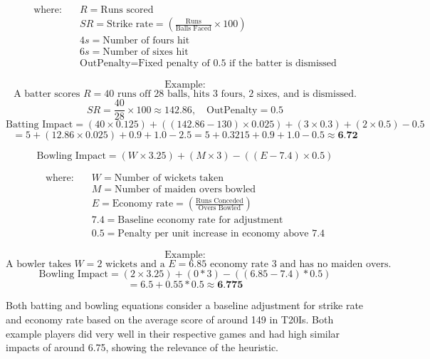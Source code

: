\documentclass{article}[12pt]
\begin{document}
\[
\begin{aligned}
\text{where:} \quad 
& R = \text{Runs scored} \\
& SR = \text{Strike rate} = \left( \frac{\text{Runs}}{\text{Balls Faced}} \times 100 \right) \\
& 4s = \text{Number of fours hit} \\
& 6s = \text{Number of sixes hit} \\
& \text{OutPenalty} = \text{Fixed penalty of 0.5 if the batter is dismissed}
\end{aligned}
\]

\[
\text{Example:}
\]
\[
\text{A batter scores } R = 40 \text{ runs off } 28 \text{ balls, hits } 3 \text{ fours, 2 sixes, and is dismissed.}
\]
\[
SR = \frac{40}{28} \times 100 \approx 142.86, \quad \text{OutPenalty} = 0.5
\]
\[
\text{Batting Impact} = (40 \times 0.125) + ((142.86 - 130) \times 0.025) + (3 \times 0.3) + (2 \times 0.5) - 0.5
\]
\[
= 5 + (12.86 \times 0.025) + 0.9 + 1.0 - 2.5 = 5 + 0.3215 + 0.9 + 1.0 - 0.5 \approx \textbf{6.72}
\]

\begin{equation}
    \text{Bowling Impact} = (W \times 3.25) + (M \times 3) - ((E - 7.4) \times 0.5)
    \label{eq2}
\end{equation}

\[
\begin{aligned}
\text{where:} \quad 
& W = \text{Number of wickets taken} \\
& M = \text{Number of maiden overs bowled} \\
& E = \text{Economy rate} = \left( \frac{\text{Runs Conceded}}{\text{Overs Bowled}} \right) \\
& 7.4 = \text{Baseline economy rate for adjustment} \\
& 0.5 = \text{Penalty per unit increase in economy above 7.4}
\end{aligned}
\]

\[
\text{Example:}
\]
\[
\text{A bowler takes } W = 2 \text{ wickets and a } E = 6.85 \text{ economy rate } 3 \text{ and has no maiden overs.}
\]
\[
\text{Bowling Impact} = (2 \times 3.25) + (0 * 3) - ((6.85 - 7.4) * 0.5)
\]
\[
= 6.5 + 0.55 * 0.5 \approx \textbf{6.775}
\]

Both batting and bowling equations consider a baseline adjustment for strike rate and economy rate based on the average score of around 149 in T20Is. \parencite{statsguru_2025_total} Both example players did very well in their respective games and had high similar impacts of around 6.75, showing the relevance of the heuristic.
\end{document}
